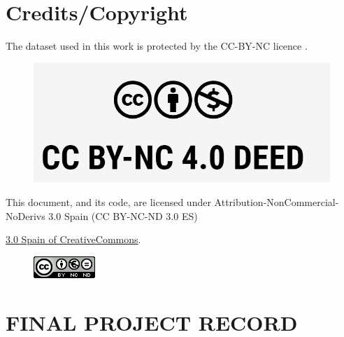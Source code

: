 \setcounter{page}{1}
\pagestyle{plain}

\chapter*{Credits/Copyright}

The dataset used in this work is protected by the CC-BY-NC licence \cite{cc_by_nc_license}.

\begin{figure}[ht]
\centering
\includegraphics[scale=1]{images/CC BY-NC license.png}
\end{figure}

\vspace{1cm}

This document, and its code, are licensed under Attribution-NonCommercial-NoDerivs 3.0 Spain (CC BY-NC-ND 3.0 ES) 

\href{https://creativecommons.org/licenses/by-nc-nd/3.0/es/}{3.0 Spain of CreativeCommons}.


\begin{figure}[ht]
\centering
\includegraphics[scale=1]{images/license.png}
\end{figure}




\chapter*{FINAL PROJECT RECORD}

